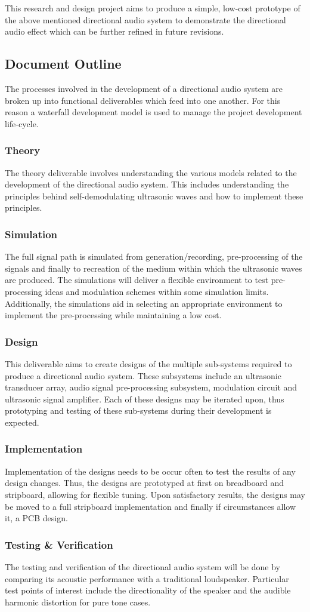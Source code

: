 This research and design project aims to produce a simple, low-cost prototype of the above mentioned directional audio system to demonstrate the directional audio effect which can be further refined in future revisions.

\subsection{Document Outline}
The processes involved in the development of a directional audio system are broken up into functional deliverables which feed into one another. For this reason a waterfall development model is used to manage the project development life-cycle.
\subsubsection{Theory}
The theory deliverable involves understanding the various models related to the development of the directional audio system. This includes understanding the principles behind self-demodulating ultrasonic waves and how to implement these principles.
\subsubsection{Simulation}
The full signal path is simulated from generation/recording, pre-processing of the signals and finally to recreation of the medium within which the ultrasonic waves are produced. The simulations will deliver a flexible environment to test pre-processing ideas and modulation schemes within some simulation limits. Additionally, the simulations aid in selecting an appropriate environment to implement the pre-processing while maintaining a low cost.
\subsubsection{Design}
This deliverable aims to create designs of the multiple sub-systems required to produce a directional audio system. These subsystems include an ultrasonic transducer array, audio signal pre-processing subsystem, modulation circuit and ultrasonic signal amplifier. Each of these designs may be iterated upon, thus prototyping and testing of these sub-systems during their development is expected.
\subsubsection{Implementation}
Implementation of the designs needs to be occur often to test the results of any design changes. Thus, the designs are prototyped at first on breadboard and stripboard, allowing for flexible tuning. Upon satisfactory results, the designs may be moved to a full stripboard implementation and finally if circumstances allow it, a PCB design.
\subsubsection{Testing \& Verification}
The testing and verification of the directional audio system will be done by comparing its acoustic performance with a traditional loudspeaker. Particular test points of interest include the directionality of the speaker and the audible harmonic distortion for pure tone cases.